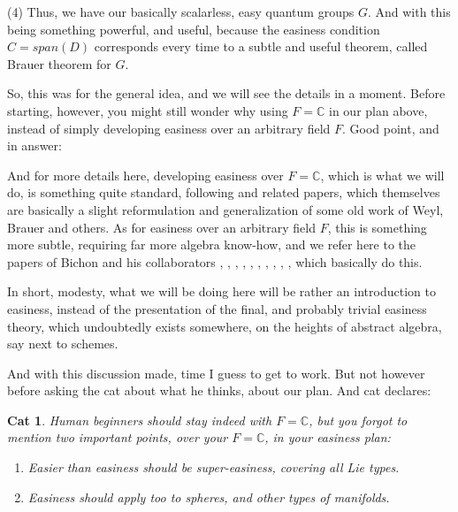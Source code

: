 \documentclass[12pt]{amsbook}
\newtheorem{cat}[theorem]{Cat}
\newtheorem{comment}[theorem]{Comment}
\begin{document}
\bigskip

(4) Thus, we have our basically scalarless, easy quantum groups $G$. And with this being something powerful, and useful, because the easiness condition $C=span(D)$ corresponds every time to a subtle and useful theorem, called Brauer theorem for $G$.

\bigskip

So, this was for the general idea, and we will see the details in a moment. Before starting, however, you might still wonder why using $F=\mathbb C$ in our plan above, instead of simply developing easiness over an arbitrary field $F$. Good point, and in answer:

And for more details here, developing easiness over $F=\mathbb C$, which is what we will do, is something quite standard, following \cite{bsp} and related papers, which themselves are basically a slight reformulation and generalization of some old work of Weyl, Brauer and others. As for easiness over an arbitrary field $F$, this is something more subtle, requiring far more algebra know-how, and we refer here to the papers of Bichon and his collaborators \cite{bi1}, \cite{bi2}, \cite{bi3}, \cite{bi4}, \cite{bi5}, \cite{bdv}, \cite{bd1}, \cite{bd2}, \cite{bna}, \cite{bny}, which basically do this.

\bigskip

In short, modesty, what we will be doing here will be rather an introduction to easiness, instead of the presentation of the final, and probably trivial easiness theory, which undoubtedly exists somewhere, on the heights of abstract algebra, say next to schemes.

\bigskip

And with this discussion made, time I guess to get to work. But not however before asking the cat about what he thinks, about our plan. And cat declares:

\begin{cat}
Human beginners should stay indeed with $F=\mathbb C$, but you forgot to mention two important points, over your $F=\mathbb C$, in your easiness plan:
\begin{enumerate}
\item Easier than easiness should be super-easiness, covering all Lie types.

\item Easiness should apply too to spheres, and other types of manifolds.
\end{enumerate}
\end{cat}
\end{document}
